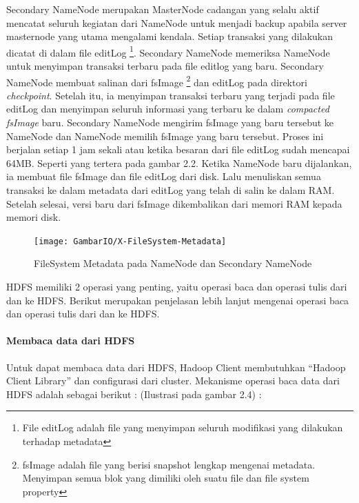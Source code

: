 \begin{enumerate}
			Secondary NameNode merupakan MasterNode cadangan yang selalu aktif mencatat seluruh kegiatan dari NameNode untuk menjadi backup apabila server masternode yang utama mengalami kendala. Setiap transaksi yang dilakukan dicatat di dalam file editLog \footnote{File editLog adalah file yang menyimpan seluruh modifikasi yang dilakukan terhadap metadata}. Secondary NameNode memeriksa NameNode untuk menyimpan transaksi terbaru pada file editlog yang baru. Secondary NameNode membuat salinan dari fsImage \footnote{fsImage adalah file yang berisi snapshot lengkap mengenai metadata. Menyimpan semua blok yang dimiliki oleh suatu file dan file system property} dan editLog pada direktori \textit{checkpoint}. Setelah itu, ia menyimpan transaksi terbaru yang terjadi pada file editLog dan menyimpan seluruh informasi yang terbaru ke dalam \textit{compacted fsImage} baru. Secondary NameNode mengirim fsImage yang baru tersebut ke NameNode dan NameNode memilih fsImage yang baru tersebut. Proses ini berjalan setiap 1 jam sekali atau ketika besaran dari file editLog sudah mencapai 64MB. 
			Seperti yang tertera pada gambar 2.2. Ketika NameNode baru dijalankan, ia membuat file fsImage dan file editLog dari disk. Lalu menuliskan semua transaksi ke dalam metadata dari editLog yang telah di salin ke dalam RAM. Setelah selesai, versi baru dari fsImage dikembalikan dari memori RAM kepada memori disk.
		\end{enumerate}		
		
			
			\begin{figure}[ht]
			\centering
			\texttt{[image: GambarIO/X-FileSystem-Metadata]}
			\caption[FileSystem Metadata pada NameNode dan Secondary NameNode]{FileSystem Metadata pada NameNode dan Secondary NameNode}
			\label{fig:FileSystem Metadata pada NameNode dan Secondary NameNode}
			\end{figure}
			
			HDFS memiliki 2 operasi yang penting, yaitu operasi baca dan operasi tulis dari dan ke HDFS. Berikut merupakan penjelasan lebih lanjut mengenai operasi baca dan operasi tulis dari dan ke HDFS.
		
		\paragraph{Membaca data dari HDFS}
			Untuk dapat membaca data dari HDFS, Hadoop Client membutuhkan "`Hadoop Client Library"' dan configurasi dari cluster. Mekanisme operasi baca data dari HDFS adalah sebagai berikut : (Ilustrasi pada gambar 2.4) : 
			
